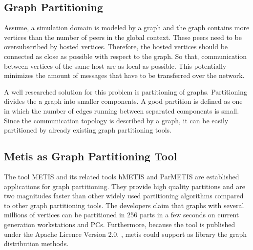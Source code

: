 \subsection*{Graph Partitioning}

Assume, a simulation domain is modeled by a graph and the graph
contains more vertices than the number of peers in the global
context. These peers need to be oversubscribed by hosted vertices.
Therefore, the hosted vertices should be connected as
close as possible with respect to the graph. So that, communication
between vertices of the same host are as local as possible. This
potentially minimizes the amount of messages that have to be
transferred over the network.

A well researched solution for this problem is partitioning of
graphs. Partitioning divides the a graph into smaller components.  A
good partition is defined as one in which the number of edges
running between separated components is small. Since the
communication topology is described by a graph, it can be easily
partitioned by already existing graph partitioning tools.


\subsection*{Metis as Graph Partitioning Tool}
The tool METIS and its related tools hMETIS and ParMETIS are
established applications for graph partitioning. They provide high
quality partitions and are two magnitudes faster than other widely
used partitioning algorithms compared to other graph partitioning
tools. The developers claim that graphs with several millions of
vertices can be partitioned in 256 parts in a few seconds on current
generation workstations and PCs.  Furthermore, because the tool is
published under the Apache Licence Version 2.0. , metis could
support as library the graph distribution methods.

  
